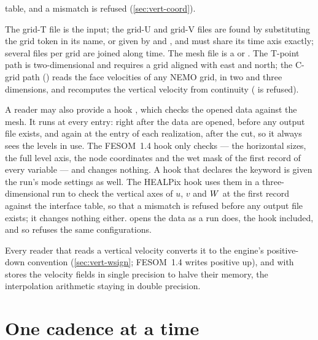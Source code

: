\begin{description}[font=\normalfont\bfseries,style=nextline,leftmargin=1.5em]
    table, and a mismatch is refused (\cref{sec:vert-coord}).
  \item[NEMO] The grid-T file is the input; the grid-U and grid-V files are found by substituting the grid
    token in its name, or given by  and , and must share its
    time axis exactly; several files per grid are joined along time. The mesh file is a 
    or . The T-point path is two-dimensional and requires a grid aligned with east and
    north; the C-grid path () reads the face velocities of any NEMO grid, in
    two and three dimensions, and recomputes the vertical velocity from continuity (
    is refused).
\end{description}
A reader may also provide a hook , which checks the opened data against the mesh. It runs at every
entry: right after the data are opened, before any output file exists, and again at the entry of each
realization, after the  cut, so it always sees the levels in use. The FESOM~1.4 hook only
checks --- the horizontal sizes, the full level axis, the node coordinates and the wet mask of the first record
of every variable --- and changes nothing. A hook that declares the keyword  is given the
run's mode settings as well. The HEALPix hook uses them in a three-dimensional run to check the vertical axes
of $u$, $v$ and $W$ at the first record against the interface table, so that a mismatch is refused before
any output file exists; it changes nothing either.  opens the data as a run does, the hook
included, and so refuses the same configurations.

Every reader that reads a vertical velocity converts it to the engine's positive-down convention
(\cref{sec:vert-wsign}; FESOM~1.4 writes  positive up), and with  stores the velocity fields in single precision to
halve their memory, the interpolation arithmetic staying in double precision.

\section{One cadence at a time}\label{sec:input-cadence}

